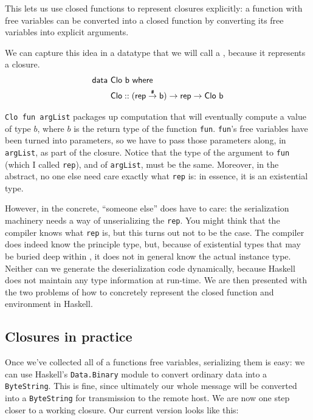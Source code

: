 \documentclass[preprint]{sigplanconf}
\begin{document}
This lets us use closed functions to represent closures explicitly: a function with free variables can be converted into a closed function by converting its free variables into explicit arguments.

We can capture this idea in a datatype that we will call a , because it represents a closure.
\begin{align*}
\textsf{data}~&\textsf{Clo}~\textsf{b}~\textsf{where}\\
				 	&\sf Clo :: \sf (rep \stackrel{\texttt{\#}}{\rightarrow} b) \rightarrow rep \rightarrow Clo~b
\end{align*}

\texttt{Clo fun argList} packages up computation that will eventually compute a value of type $b$, where $b$ is the return type of the function \texttt{fun}.  
\texttt{fun}'s free variables have been turned into parameters, so we have to pass those parameters along, in \texttt{argList}, as part of the closure.  
Notice that the type of the argument to \texttt{fun} (which I called \texttt{rep}), and of \texttt{argList}, must be the same.
Moreover, in the abstract, no one else need care exactly what \texttt{rep} is: in essence, it is an existential type.

However, in the concrete, ``someone else'' does have to care: the serialization machinery needs a way of unserializing the \texttt{rep}.  
You might think that the compiler knows what \texttt{rep} is, but this turns out not to be the case. 
The compiler does indeed know the principle type, but, because of existential types that may be buried deep within , it does not in general know the 
actual instance type. Neither can we generate the deserialization code dynamically, because Haskell does not maintain any type information at run-time. We are then presented with the two problems of how to concretely represent the closed function and environment in Haskell.


\subsection{Closures in practice}

Once we've collected all of a functions free variables, serializing them is easy: we can use Haskell's \texttt{Data.Binary} module to convert ordinary data into a \texttt{ByteString}. This is fine, since ultimately our whole message will be converted into a \texttt{ByteString} for transmission to the remote host. We are now one step closer to a working closure. Our current version looks like this:
\end{document}
